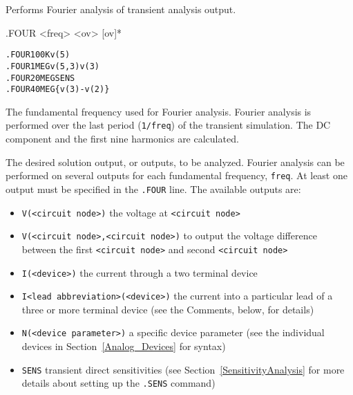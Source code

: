



Performs Fourier analysis of transient analysis output.

\begin{Command}

\format
.FOUR <freq> <ov> [ov]*

\examples
\begin{alltt}
.FOUR 100K v(5)
.FOUR 1MEG v(5,3) v(3)
.FOUR 20MEG  SENS
.FOUR 40MEG  \{v(3)-v(2)\}
\end{alltt}

\arguments

\begin {Arguments}

The fundamental frequency used for Fourier analysis.
Fourier analysis is performed over the last period (\texttt{1/freq}) of the transient simulation.
The DC component and the first nine harmonics are calculated.  

The desired solution output, or outputs, to be analyzed. Fourier analysis can be performed
on several outputs for each fundamental frequency, \texttt{freq}. At least one
output must be specified in the {\tt .FOUR} line.  The available outputs are:

\begin{itemize}
\item \texttt{V(<circuit node>)} the voltage at \texttt{<circuit node>}
\item \texttt{V(<circuit node>,<circuit node>)} to output the voltage difference between the first \texttt{<circuit node>} and second \texttt{<circuit node>}  
\item \texttt{I(<device>)} the current through a two terminal device
\item \texttt{I<lead abbreviation>(<device>)} the current into a particular lead of a three or more terminal device (see the Comments, below, for details)
\item \texttt{N(<device parameter>)} a specific device parameter (see the individual devices in Section~\ref{Analog_Devices} for syntax)
\item \texttt{SENS} transient direct sensitivities (see Section~\ref{SensitivityAnalysis} for more details about setting up the \texttt{.SENS} command)
\end{itemize}


\end{Arguments}
\end{Command}
